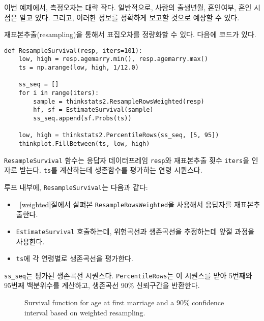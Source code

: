 
이번 예제에서, 측정오차는 대략 작다. 일반적으로, 사람의 출생년월, 혼인여부, 혼인 시점은 알고 있다. 그리고, 이러한 정보를 정확하게 보고할 것으로 예상할 수 있다.

재표본추출(resampling)을 통해서 표집오차를 정량화할 수 있다. 다음에 코드가 있다.

\begin{verbatim}
def ResampleSurvival(resp, iters=101):
    low, high = resp.agemarry.min(), resp.agemarry.max()
    ts = np.arange(low, high, 1/12.0)

    ss_seq = []
    for i in range(iters):
        sample = thinkstats2.ResampleRowsWeighted(resp)
        hf, sf = EstimateSurvival(sample)
        ss_seq.append(sf.Probs(ts))

    low, high = thinkstats2.PercentileRows(ss_seq, [5, 95])
    thinkplot.FillBetween(ts, low, high)
\end{verbatim}

{\tt ResampleSurvival} 함수는 응답자 데이터프레임 {\tt resp}와
재표본추출 횟수 {\tt iters}을 인자로 받는다.
{\tt ts}를 계산하는데 생존함수를 평가하는 연령 시퀀스다.

루프 내부에, {\tt ResampleSurvival}는 다음과 같다:

\begin{itemize}

\item ~\ref{weighted}절에서 살펴본 {\tt ResampleRowsWeighted}을 사용해서 응답자를 재표본추출한다.

\item {\tt EstimateSurvival} 호출하는데, 위험곡선과 생존곡선을 추정하는데 앞절 과정을 사용한다.

\item {\tt ts}에 각 연령별로 생존곡선을 평가한다.

\end{itemize}

\verb"ss_seq"는 평가된 생존곡선 시퀀스다. 
{\tt PercentileRows}는 이 시퀀스를 받아 5번째와 95번째 백분위수를 계산하고, 생존곡선 90\% 신뢰구간을 반환한다.

\begin{figure}
\caption{Survival function for age at first marriage and a 90\%
confidence interval based on weighted resampling.}
\label{survival3}
\end{figure}

